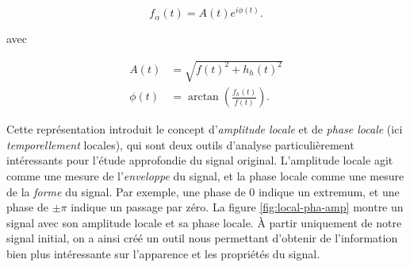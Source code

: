 \begin{equation}
    f_{\alpha} (t) = A(t)e^{i\phi(t)}.
\end{equation}

avec 

\begin{align}
    A(t) &= \sqrt{f(t)^2 + h_h(t)^2} \\
    \phi(t) &= \arctan\left(\frac{f_h(t)}{f(t)}\right).
\end{align}

Cette représentation introduit le concept d'\textit{amplitude locale} et de \textit{phase locale} (ici \textit{temporellement} locales), qui sont deux outils d'analyse particulièrement intéressants pour l'étude approfondie du signal original. L'amplitude locale agit comme une mesure de l'\textit{enveloppe} du signal, et la phase locale comme une mesure de la \textit{forme} du signal. Par exemple, une phase de $0$ indique un extremum, et une phase de $\pm\pi$ indique un passage par zéro. La figure \ref{fig:local-pha-amp} montre un signal avec son amplitude locale et sa phase locale. À partir uniquement de notre signal initial, on a ainsi créé un outil nous permettant d'obtenir de l'information bien plus intéressante sur l'apparence et les propriétés du signal.

